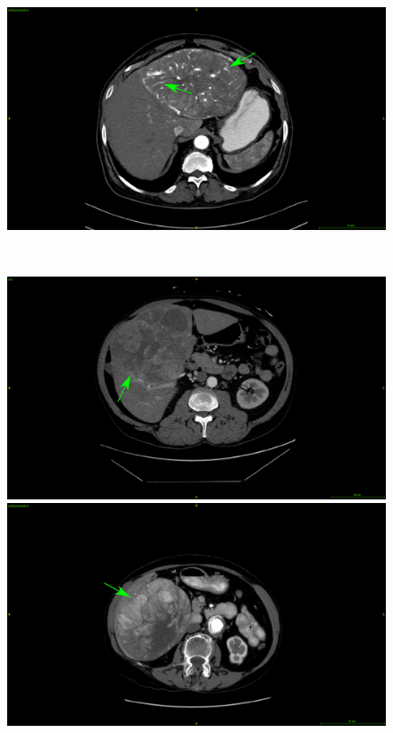 {\begin{figure}[!ht]
\begin{mdframed}[backgroundcolor=blue!50,linecolor=blue!50]
\begin{minipage}{0.45\linewidth}
		\end{minipage} \hspace{-0.1cm}
		\begin{minipage}{0.45\linewidth}
			\includegraphics[width=\linewidth]{images/ImagingTraits/ResizeTCIA_internalArteries}
		\end{minipage} \\
		\begin{minipage}{0.45\linewidth}
			\includegraphics[width=\linewidth]{images/ImagingTraits/ResizeGDB_texturalHeterogeneity}
		\end{minipage} \hspace{-0.1cm}
		\begin{minipage}{0.45\linewidth}
			\includegraphics[width=\linewidth]{images/ImagingTraits/ResizeTCIA_texturalHeterogeneity}

\end{minipage}
\end{mdframed}
\end{figure}}
